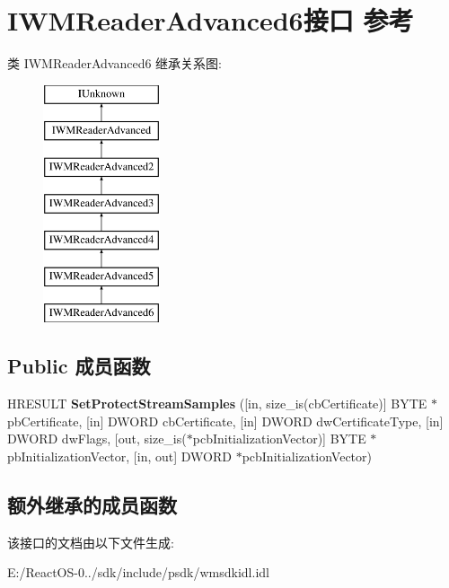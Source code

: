 \hypertarget{interface_i_w_m_reader_advanced6}{}\section{I\+W\+M\+Reader\+Advanced6接口 参考}
\label{interface_i_w_m_reader_advanced6}
类 I\+W\+M\+Reader\+Advanced6 继承关系图\+:\begin{figure}[H]
\begin{center}
\leavevmode
\includegraphics[height=7.000000cm]{interface_i_w_m_reader_advanced6}
\end{center}
\end{figure}
\subsection*{Public 成员函数}
\begin{DoxyCompactItemize}
\item 
\mbox{\label{interface_i_w_m_reader_advanced6_a72fe51727c0570aa6a1eeeb01b30a118}} 
H\+R\+E\+S\+U\+LT {\bfseries Set\+Protect\+Stream\+Samples} (\mbox{[}in, size\+\_\+is(cb\+Certificate)\mbox{]} B\+Y\+TE $\ast$pb\+Certificate, \mbox{[}in\mbox{]} D\+W\+O\+RD cb\+Certificate, \mbox{[}in\mbox{]} D\+W\+O\+RD dw\+Certificate\+Type, \mbox{[}in\mbox{]} D\+W\+O\+RD dw\+Flags, \mbox{[}out, size\+\_\+is($\ast$pcb\+Initialization\+Vector)\mbox{]} B\+Y\+TE $\ast$pb\+Initialization\+Vector, \mbox{[}in, out\mbox{]} D\+W\+O\+RD $\ast$pcb\+Initialization\+Vector)
\end{DoxyCompactItemize}
\subsection*{额外继承的成员函数}


该接口的文档由以下文件生成\+:\begin{DoxyCompactItemize}
\item 
E\+:/\+React\+O\+S-\/0../sdk/include/psdk/wmsdkidl.\+idl\end{DoxyCompactItemize}
